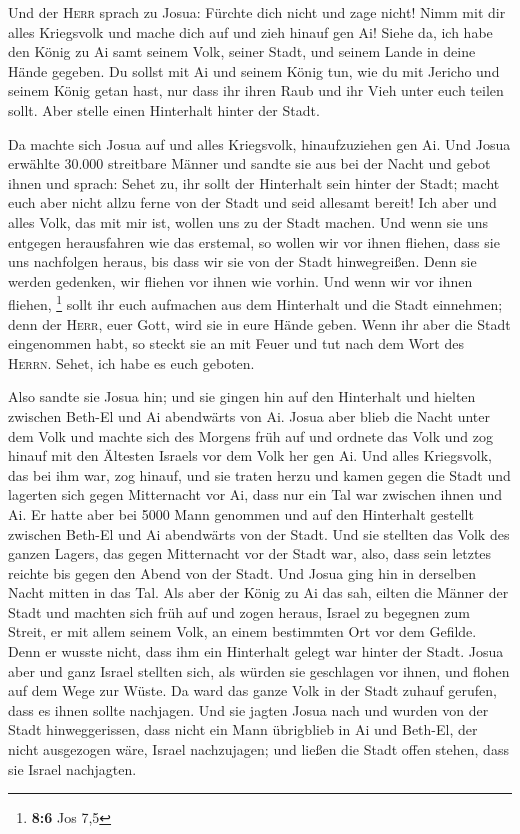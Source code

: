 Und der \textsc{Herr} sprach zu Josua: Fürchte dich nicht
und zage nicht! Nimm mit dir alles Kriegsvolk und mache dich auf und
zieh hinauf gen Ai! Siehe da, ich habe den König zu Ai samt seinem Volk,
seiner Stadt, und seinem Lande in deine Hände gegeben.  Du
sollst mit Ai und seinem König tun, wie du mit Jericho und seinem König
getan hast, nur dass ihr ihren Raub und ihr Vieh unter euch teilen
sollt. Aber stelle einen Hinterhalt hinter der Stadt.

 Da machte sich Josua auf und alles Kriegsvolk,
hinaufzuziehen gen Ai. Und Josua erwählte 30.000 streitbare Männer und
sandte sie aus bei der Nacht  und gebot ihnen und sprach:
Sehet zu, ihr sollt der Hinterhalt sein hinter der Stadt; macht euch
aber nicht allzu ferne von der Stadt und seid allesamt bereit!
 Ich aber und alles Volk, das mit mir ist, wollen uns zu
der Stadt machen. Und wenn sie uns entgegen herausfahren wie das
erstemal, so wollen wir vor ihnen fliehen,  dass sie uns
nachfolgen heraus, bis dass wir sie von der Stadt hinwegreißen. Denn sie
werden gedenken, wir fliehen vor ihnen wie vorhin. Und wenn wir vor
ihnen fliehen, \footnote{\textbf{8:6} Jos 7,5}  sollt ihr
euch aufmachen aus dem Hinterhalt und die Stadt einnehmen; denn der
\textsc{Herr}, euer Gott, wird sie in eure Hände geben. 
Wenn ihr aber die Stadt eingenommen habt, so steckt sie an mit Feuer und
tut nach dem Wort des \textsc{Herrn}. Sehet, ich habe es euch geboten.

 Also sandte sie Josua hin; und sie gingen hin auf den
Hinterhalt und hielten zwischen Beth-El und Ai abendwärts von Ai. Josua
aber blieb die Nacht unter dem Volk  und machte sich des
Morgens früh auf und ordnete das Volk und zog hinauf mit den Ältesten
Israels vor dem Volk her gen Ai.  Und alles Kriegsvolk,
das bei ihm war, zog hinauf, und sie traten herzu und kamen gegen die
Stadt und lagerten sich gegen Mitternacht vor Ai, dass nur ein Tal war
zwischen ihnen und Ai.  Er hatte aber bei 5000 Mann
genommen und auf den Hinterhalt gestellt zwischen Beth-El und Ai
abendwärts von der Stadt.  Und sie stellten das Volk des
ganzen Lagers, das gegen Mitternacht vor der Stadt war, also, dass sein
letztes reichte bis gegen den Abend von der Stadt. Und Josua ging hin in
derselben Nacht mitten in das Tal.  Als aber der König zu
Ai das sah, eilten die Männer der Stadt und machten sich früh auf und
zogen heraus, Israel zu begegnen zum Streit, er mit allem seinem Volk,
an einem bestimmten Ort vor dem Gefilde. Denn er wusste nicht, dass ihm
ein Hinterhalt gelegt war hinter der Stadt.  Josua aber
und ganz Israel stellten sich, als würden sie geschlagen vor ihnen, und
flohen auf dem Wege zur Wüste.  Da ward das ganze Volk in
der Stadt zuhauf gerufen, dass es ihnen sollte nachjagen.
 Und sie jagten Josua nach und wurden von der Stadt
hinweggerissen, dass nicht ein Mann übrigblieb in Ai und Beth-El, der
nicht ausgezogen wäre, Israel nachzujagen; und ließen die Stadt offen
stehen, dass sie Israel nachjagten.

